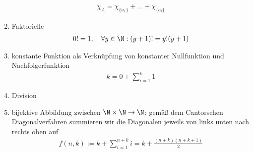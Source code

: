 \begin{solution}
\begin{enumerate}
			\begin{align*}
			\chi_A = \chi_{\{a_1\}} + \dots + \chi_{\{a_l\}}
			\end{align*}
		\item Faktorielle
			\begin{align*}
			0! = 1, \quad \forall y \in \N: (y + 1)! = y! (y + 1)
			\end{align*}
		\item konstante Funktion als Verknüpfung von konstanter Nullfunktion und Nachfolgerfunktion
			\begin{align*}
			k = 0 + \sum_{i = 1}^k 1
			\end{align*}
		\item Division
		\item bijektive Abbildung zwischen $\N \times \N \to \N$: gemäß dem Cantorschen Diagonalverfahren summieren wir die Diagonalen jeweils von links unten nach rechts oben auf
			\begin{align*}
			f(n,k) := k + \sum_{i = 1}^{n + k} i = k + \frac{(n + k) (n + k + 1)}{2}
			\end{align*}
	\end{enumerate}

\end{solution}

